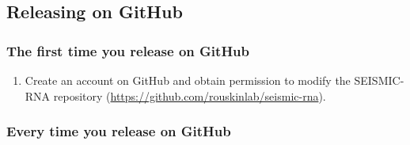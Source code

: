 \documentclass[main.tex]{subfiles}
\begin{document}
\subsection{Releasing on GitHub}

\subsubsection{The first time you release on GitHub}

\begin{enumerate}
    \item Create an account on GitHub and obtain permission to modify the SEISMIC-RNA repository (\url{https://github.com/rouskinlab/seismic-rna}).
\end{enumerate}


\subsubsection{Every time you release on GitHub}
\end{document}
